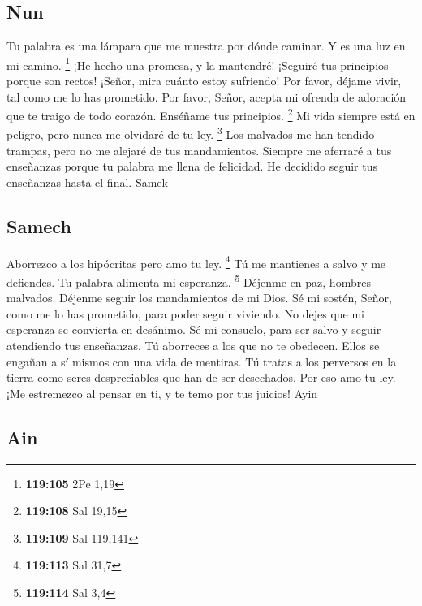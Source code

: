 \hypertarget{nun}{%
\subsection{Nun}\label{nun}}

 Tu palabra es una lámpara que me muestra por dónde
caminar. Y es una luz en mi camino. \footnote{\textbf{119:105} 2Pe 1,19}
 ¡He hecho una promesa, y la mantendré! ¡Seguiré tus
principios porque son rectos!  ¡Señor, mira cuánto estoy
sufriendo! Por favor, déjame vivir, tal como me lo has prometido.
 Por favor, Señor, acepta mi ofrenda de adoración que te
traigo de todo corazón. Enséñame tus principios. \footnote{\textbf{119:108}
  Sal 19,15}  Mi vida siempre está en peligro, pero nunca
me olvidaré de tu ley. \footnote{\textbf{119:109} Sal 119,141}
 Los malvados me han tendido trampas, pero no me alejaré
de tus mandamientos.  Siempre me aferraré a tus enseñanzas
porque tu palabra me llena de felicidad.  He decidido
seguir tus enseñanzas hasta el final. Samek

\hypertarget{samech}{%
\subsection{Samech}\label{samech}}

 Aborrezco a los hipócritas pero amo tu ley. \footnote{\textbf{119:113}
  Sal 31,7}  Tú me mantienes a salvo y me defiendes. Tu
palabra alimenta mi esperanza. \footnote{\textbf{119:114} Sal 3,4}
 Déjenme en paz, hombres malvados. Déjenme seguir los
mandamientos de mi Dios.  Sé mi sostén, Señor, como me lo
has prometido, para poder seguir viviendo. No dejes que mi esperanza se
convierta en desánimo.  Sé mi consuelo, para ser salvo y
seguir atendiendo tus enseñanzas.  Tú aborreces a los que
no te obedecen. Ellos se engañan a sí mismos con una vida de mentiras.
 Tú tratas a los perversos en la tierra como seres
despreciables que han de ser desechados. Por eso amo tu ley.
 ¡Me estremezco al pensar en ti, y te temo por tus
juicios! Ayin

\hypertarget{ain}{%
\subsection{Ain}\label{ain}}

